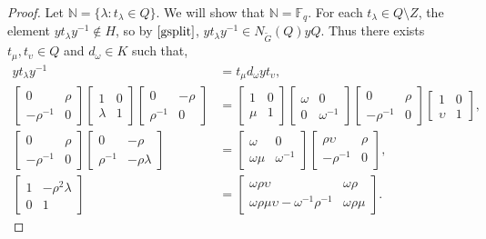 \begin{proof}
Let $\mathbb{N} = \{ \lambda : t_\lambda \in Q \}$. We will show that $\mathbb{N} =\mathbb{F}_q$. For each $t_\lambda \in Q \setminus Z$, the element $y t_\lambda y^{-1} \notin H$, so by $\eqref{gsplit}$, $y t_\lambda y^{-1} \in N_{\widetilde{G}}(Q) y Q$. Thus there exists $t_\mu, t_\upsilon \in Q$ and $d_\omega \in K$ such that,
\begin{align*} y t_\lambda y^{-1} &= t_\mu d_\omega y t_\upsilon,
\\[1.5ex] \begin{bmatrix} 0 & \rho \\ -\rho^{-1} & 0 \end{bmatrix}\begin{bmatrix} 1 & 0 \\ \lambda & 1 \end{bmatrix}\begin{bmatrix} 0 & -\rho \\ \rho^{-1} & 0 \end{bmatrix} &= \begin{bmatrix} 1 & 0 \\ \mu & 1 \end{bmatrix}\begin{bmatrix} \omega & 0 \\ 0 & \omega^{-1} \end{bmatrix}\begin{bmatrix} 0 & \rho \\ -\rho^{-1} & 0 \end{bmatrix}\begin{bmatrix} 1 & 0 \\ \upsilon & 1 \end{bmatrix},
\\[1.5ex] \begin{bmatrix} 0 & \rho \\ -\rho^{-1} & 0 \end{bmatrix}\begin{bmatrix} 0 & -\rho \\ \rho^{-1} & -\rho \lambda \end{bmatrix} &= \begin{bmatrix} \omega & 0 \\ \omega \mu & \omega^{-1} \end{bmatrix}\begin{bmatrix} \rho \upsilon & \rho \\ -\rho^{-1} & 0 \end{bmatrix},
\\[1.5ex] \begin{bmatrix} 1 & -\rho^2 \lambda \\ 0 & 1 \end{bmatrix} &= \begin{bmatrix} \omega \rho \upsilon & \omega \rho \\ \omega \rho \mu \upsilon - \omega^{-1} \rho^{-1} & \omega \rho \mu \end{bmatrix}.
\end{align*}


\end{proof}
